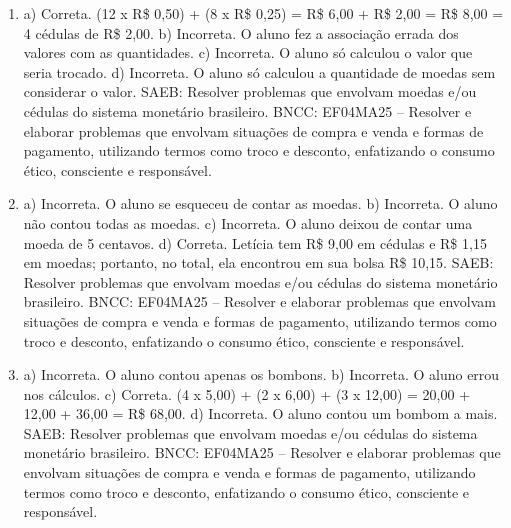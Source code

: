 \begin{enumerate}
\item
a) Correta. (12 x R\$ 0,50) + (8 x R\$ 0,25) = R\$ 6,00 + R\$ 2,00 = R\$ 8,00 = 4 cédulas de R\$ 2,00.
b) Incorreta. O aluno fez a associação errada dos valores com as quantidades.
c) Incorreta. O aluno só calculou o valor que seria trocado.
d) Incorreta. O aluno só calculou a quantidade de moedas sem considerar o valor.
SAEB: Resolver problemas que envolvam moedas e/ou cédulas do sistema monetário brasileiro.
BNCC: EF04MA25 -- Resolver e elaborar problemas que envolvam situações de compra e venda e formas
de pagamento, utilizando termos como troco e desconto, enfatizando o consumo ético, consciente e
responsável.

\item
a) Incorreta. O aluno se esqueceu de contar as moedas.
b) Incorreta. O aluno não contou todas as moedas.
c) Incorreta. O aluno deixou de contar uma moeda de 5 centavos.
d) Correta. Letícia tem R\$ 9,00 em cédulas e R\$ 1,15 em moedas; portanto, no total, ela
encontrou em sua bolsa R\$ 10,15.
SAEB: Resolver problemas que envolvam moedas e/ou cédulas do sistema monetário brasileiro.
BNCC: EF04MA25 -- Resolver e elaborar problemas que envolvam situações de compra e venda e formas
de pagamento, utilizando termos como troco e desconto, enfatizando o consumo ético, consciente e
responsável.

\item
a) Incorreta. O aluno contou apenas os bombons.
b) Incorreta. O aluno errou nos cálculos.
c) Correta. (4 x 5,00) + (2 x 6,00) + (3 x 12,00) = 20,00 + 12,00 + 36,00 = R\$ 68,00.
d) Incorreta. O aluno contou um bombom a mais.
SAEB: Resolver problemas que envolvam moedas e/ou cédulas do sistema monetário brasileiro.
BNCC: EF04MA25 -- Resolver e elaborar problemas que envolvam situações de compra e venda e formas
de pagamento, utilizando termos como troco e desconto, enfatizando o consumo ético, consciente e
responsável.
\end{enumerate}


